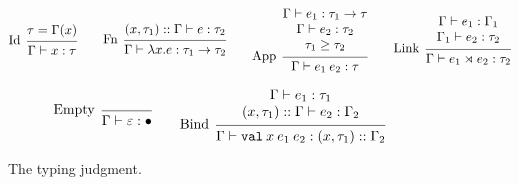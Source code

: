 \documentclass{article}
\theoremstyle{definition}
\newcommand*{\cons}{::}
\newcommand*{\link}[2]{{#1}\rtimes{#2}}
\newcommand*{\Lete}{\mathtt{val}}
\begin{document}
\begin{figure}[h!]
	\footnotesize
	\begin{flushright}
	\end{flushright}
	\centering
	\vspace{0pt} %
	\[
		\begin{prooftree}
			\hypo{\tau=\Gamma(x)}
			\infer[left label=Id]1{
			\Gamma\vdash x:\tau
			}
		\end{prooftree}\qquad
		\begin{prooftree}
			\hypo{(x,\tau_1)\cons\Gamma\vdash e:\tau_2}
			\infer[left label=Fn]1{
			\Gamma\vdash\lambda x.e:\tau_1\rightarrow\tau_2
			}
		\end{prooftree}\qquad
		\begin{prooftree}
			\hypo{
				\begin{matrix}
					\Gamma\vdash e_1:\tau_1\rightarrow\tau \\
					\Gamma\vdash e_2:\tau_2                \\
					\tau_1\ge\tau_2
				\end{matrix}
			}
			\infer[left label={App}]1{
			\Gamma\vdash e_{1}\:e_{2}:\tau
			}
		\end{prooftree}\qquad
		\begin{prooftree}
			\hypo{
				\begin{matrix}
					\Gamma\vdash e_1:\Gamma_1 \\
					\Gamma_1\vdash e_2:\tau_2
				\end{matrix}
			}
			\infer[left label=Link]1{
			\Gamma\vdash\link{e_{1}}{e_{2}}:\tau_2
			}
		\end{prooftree}
	\]

	\[
		\begin{prooftree}
			\infer[left label=Empty]0{
			\Gamma\vdash\varepsilon:\bullet
			}
		\end{prooftree}\qquad
		\begin{prooftree}
			\hypo{
				\begin{matrix}
					\Gamma\vdash e_1:\tau_1 \\
					(x, \tau_1)\cons\Gamma\vdash e_2:\Gamma_2
				\end{matrix}
			}
			\infer[left label=Bind]1{
			\Gamma\vdash\Lete\:x\:e_1\:e_2:(x,\tau_1)\cons\Gamma_2
			}
		\end{prooftree}
	\]
	\caption{The typing judgment.}
	\label{fig:exttypjudge}
\end{figure}
\end{document}
